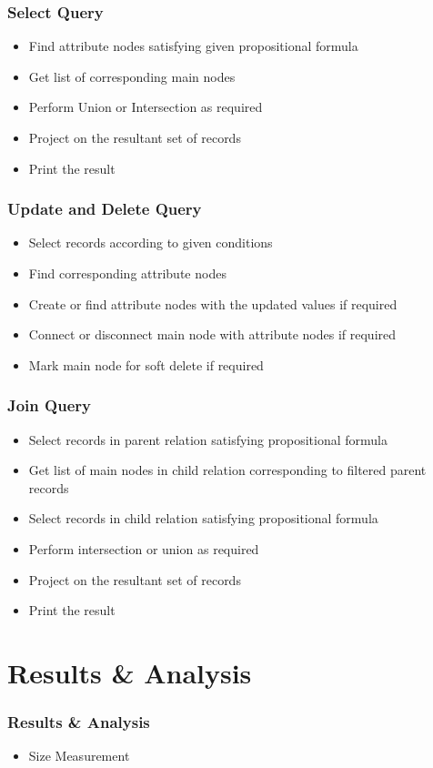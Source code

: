 \documentclass[14pt,xcolor=dvipsnames, aspectratio=169]{beamer}
\begin{document}
\begin{frame}
 \frametitle{Select Query}
 \begin{itemize}
  \item<1-> Find attribute nodes satisfying given propositional formula
  \item<2-> Get list of corresponding main nodes
  \item<3-> Perform Union or Intersection as required
  \item<4-> Project on the resultant set of records
  \item<5-> Print the result
 \end{itemize}
\end{frame}

\begin{frame}
 \frametitle{Update and Delete Query}
 \begin{itemize}
  \item<1-> Select records according to given conditions
  \item<2-> Find corresponding attribute nodes
  \item<3-> Create or find attribute nodes with the updated values if required
  \item<4-> Connect or disconnect main node with attribute nodes if required
  \item<5-> Mark main node for soft delete if required
 \end{itemize}
\end{frame}

\begin{frame}
 \frametitle{Join Query}
 \begin{itemize}
  \item<1-> Select records in parent relation satisfying propositional formula
  \item<2-> Get list of main nodes in child relation corresponding to filtered parent records
  \item<3-> Select records in child relation satisfying propositional formula
  \item<4-> Perform intersection or union as required
  \item<5-> Project on the resultant set of records
  \item<6-> Print the result
 \end{itemize}
\end{frame}

\section{Results \& Analysis}
\begin{frame}
 \frametitle{Results \& Analysis}
 \begin{itemize}
  \item Size Measurement
 \end{itemize}
\end{frame}
\end{document}
